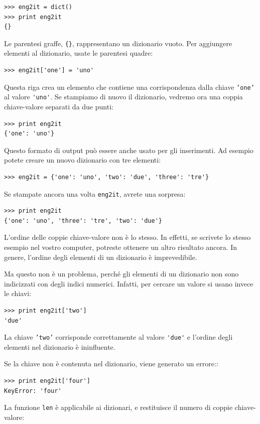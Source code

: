 \documentclass[10pt]{book}
\begin{document}
\begin{verbatim}
>>> eng2it = dict()
>>> print eng2it
{}
\end{verbatim}

Le parentesi graffe, \verb"{}", rappresentano un dizionario vuoto. Per aggiungere elementi al dizionario, usate le parentesi quadre:

\begin{verbatim}
>>> eng2it['one'] = 'uno'
\end{verbatim}
%
Questa riga crea un elemento che contiene una corrispondenza dalla chiave
{\tt 'one'} al valore \verb"'uno'".  Se stampiamo di nuovo il dizionario, vedremo ora una coppia chiave-valore separati da due punti:

\begin{verbatim}
>>> print eng2it
{'one': 'uno'}
\end{verbatim}
%
Questo formato di output può essere anche usato per gli inserimenti. Ad esempio potete creare un nuovo dizionario con tre elementi:

\begin{verbatim}
>>> eng2it = {'one': 'uno', 'two': 'due', 'three': 'tre'}
\end{verbatim}
%
Se stampate ancora una volta {\tt eng2it}, avrete una sorpresa:

\begin{verbatim}
>>> print eng2it
{'one': 'uno', 'three': 'tre', 'two': 'due'}
\end{verbatim}
%
L'ordine delle coppie chiave-valore non è lo stesso. In effetti, se scrivete lo stesso esempio nel vostro computer, potreste ottenere un altro risultato ancora. In genere, l'ordine degli elementi di un dizionario è imprevedibile.

Ma questo non è un problema, perché gli elementi di un dizionario non sono indicizzati con degli indici numerici. Infatti, per cercare un valore si usano invece le chiavi:

\begin{verbatim}
>>> print eng2it['two']
'due'
\end{verbatim}
%
La chiave {\tt 'two'} corrisponde correttamente al valore \verb"'due'" e l'ordine degli elementi nel dizionario è ininfluente.

Se la chiave non è contenuta nel dizionario, viene generato un errore::

\begin{verbatim}
>>> print eng2it['four']
KeyError: 'four'
\end{verbatim}
%
La funzione {\tt len} è applicabile ai dizionari, e restituisce il numero di coppie chiave-valore:
\end{document}
